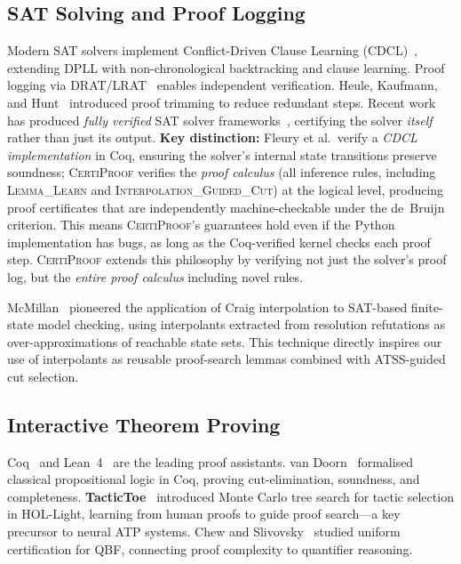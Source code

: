\documentclass[acmtocl,review,anonymous]{acmart}
\newcommand{\CP}{\textsc{CertiProof}}
\begin{document}
\subsection{SAT Solving and Proof Logging}

Modern SAT solvers implement Conflict-Driven Clause Learning
(CDCL)~\cite{Marques-Silva1999,EenSorensson2003}, extending DPLL
with non-chronological backtracking and clause learning.
Proof logging via DRAT/LRAT~\cite{HeuleHuntMahmoud2017,
GochtNordstrom2022,LammichLRAT2024} enables independent verification.
Heule, Kaufmann, and Hunt~\cite{HeuleKaufmann2023} introduced
proof trimming to reduce redundant steps.
Recent work has produced \emph{fully verified} SAT solver
frameworks~\cite{FleuryVerifiedSAT2025}, certifying the solver
\emph{itself} rather than just its output.  \textbf{Key distinction:}
Fleury et al.\ verify a \emph{CDCL implementation} in Coq, ensuring
the solver's internal state transitions preserve soundness; \CP{} verifies
the \emph{proof calculus} (all inference rules, including \textsc{Lemma\_Learn}
and \textsc{Interpolation\_Guided\_Cut}) at the logical level,
producing proof certificates that are independently machine-checkable
under the de~Bruijn criterion.  This means \CP{}'s guarantees hold
even if the Python implementation has bugs, as long as the
Coq-verified kernel checks each proof step.  \CP{} extends this philosophy
by verifying not just the solver's proof log, but the \emph{entire
proof calculus} including novel rules.

McMillan~\cite{McMillan2003} pioneered the application of Craig
interpolation to SAT-based finite-state model checking, using
interpolants extracted from resolution refutations as
over-approximations of reachable state sets.  This technique
directly inspires our use of interpolants as reusable proof-search
lemmas combined with ATSS-guided cut selection.

\subsection{Interactive Theorem Proving}

Coq~\cite{CoqDevelopmentTeam2024} and
Lean~4~\cite{MouraKong2021} are the leading proof assistants.
van Doorn~\cite{vanDoorn2015} formalised classical propositional
logic in Coq, proving cut-elimination, soundness, and completeness.
\textbf{TacticToe}~\cite{TacticToe2017} introduced Monte Carlo tree
search for tactic selection in HOL-Light, learning from human proofs
to guide proof search---a key precursor to neural ATP systems.
Chew and Slivovsky~\cite{ChewSlivovsky2024} studied uniform
certification for QBF, connecting proof complexity to quantifier
reasoning.
\end{document}
